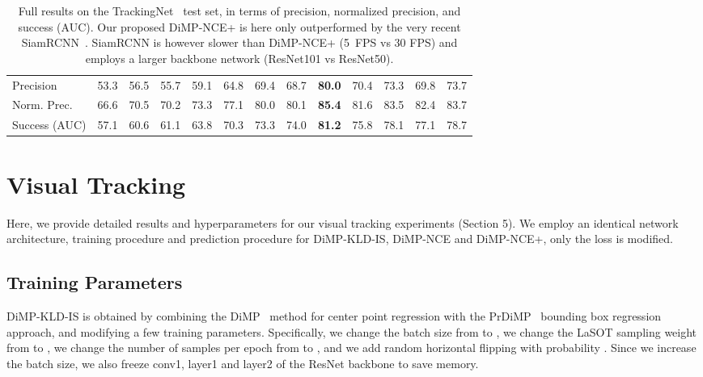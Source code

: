 \documentclass{bmvc2k}
\begin{document}
\begin{appendices}
\begin{table}[b]
{\begin{tabular}{l@{~~~}c@{~~~}c@{~~~}c@{~~~}c@{~~~}c@{~~~}c@{~~~}c@{~~~}c@{~~~}c@{~~~}c@{~~~}c@{~~~}c}
	\multirow{1}{25mm}{Precision }
	&53.3 &56.5 &55.7 &59.1 &64.8 &69.4 &68.7 &\textbf{80.0} &70.4 &73.3 &69.8 &73.7\\
	
	\multirow{1}{25mm}{Norm. Prec. }
	&66.6 &70.5 &70.2 &73.3 &77.1 &80.0 &80.1 &\textbf{85.4} &81.6 &83.5 &82.4 &83.7\\
	
	\multirow{1}{25mm}{Success (AUC) }
	&57.1 &60.6 &61.1 &63.8 &70.3 &73.3 &74.0 &\textbf{81.2} &75.8 &78.1 &77.1 &78.7\\
	
	\bottomrule
\end{tabular} 	}\vspace{-3.5mm}
\caption{Full results on the TrackingNet~\cite{muller2018trackingnet} test set, in terms of precision, normalized precision, and success (AUC). Our proposed DiMP-NCE+ is here only outperformed by the very recent SiamRCNN~\cite{voigtlaender2020siam}. SiamRCNN is however slower than DiMP-NCE+ (5~FPS vs 30 FPS) and employs a larger backbone network (ResNet101 vs ResNet50).}\vspace{-0.0mm}
	\label{tab:tracking_trackingnet}
\end{table}





\section{Visual Tracking}
\label{appendix:visual_tracking}
Here, we provide detailed results and hyperparameters for our visual tracking experiments (Section 5). We employ an identical network architecture, training procedure and prediction procedure for DiMP-KLD-IS, DiMP-NCE and DiMP-NCE+, only the loss is modified.






\subsection{Training Parameters}
DiMP-KLD-IS is obtained by combining the DiMP~\cite{bhat2019learning} method for center point regression with the PrDiMP~\cite{danelljan2020probabilistic} bounding box regression approach, and modifying a few training parameters. Specifically, we change the batch size from  to , we change the LaSOT sampling weight from  to , we change the number of samples per epoch from  to , and we add random horizontal flipping with probability . Since we increase the batch size, we also freeze conv1, layer1 and layer2 of the ResNet backbone to save memory.












\end{appendices}
\end{document}
